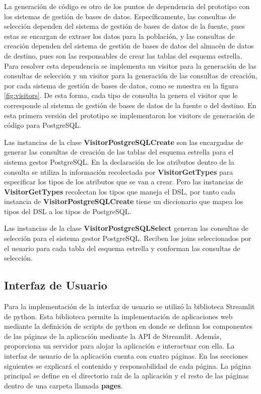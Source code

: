 La generación de código es otro de los puntos de dependencia del prototipo con los sistemas de gestión 
de bases de datos. Específicamente, las consultas de selección dependen del sistema de gestión de bases 
de datos de la fuente, pues estas se encargan de extraer los datos para la población, y las consultas 
de creación dependen del sistema de gestión de bases de datos del almacén de datos de destino, pues 
son las responsables de crear las tablas del esquema estrella. Para resolver esta dependencia 
se implementa un visitor para la generación de las consultas de selección y un visitor para la generación 
de las consultas de creación, por cada sistema de gestión de bases de datos, como se muestra en la 
figura \ref{fig:visitors}. De esta forma, cada tipo de consulta la genera el visitor que le corresponde 
al sistema de gestión de bases de datos de la fuente o del destino. En esta primera versión del prototipo 
se implementaron los visitors de generación de código para PostgreSQL.

Las instancias de la clase \textbf{VisitorPostgreSQLCreate} son las encargadas de generar las 
consultas de creación de las tablas del esquema estrella para el sistema gestor PostgreSQL. En la 
declaración de los atributos 
dentro de la consulta se utiliza la información recolectada por \textbf{VisitorGetTypes} para 
especificar los tipos de los atributos que se van a crear. Pero las instancias de \textbf{VisitorGetTypes} 
recolectan los tipos que maneja el DSL, por tanto cada instancia de \textbf{VisitorPostgreSQLCreate} 
tiene un diccionario que mapea los tipos del DSL a los tipos de PostgreSQL.

Las instancias de la clase \textbf{VisitorPostgreSQLSelect} generan las consultas de selección para 
el sistema gestor PostgreSQL. Reciben los joins seleccionados por el usuario para cada tabla del esquema 
estrella y conforman las consultas de selección.

\subsection{Interfaz de Usuario}

Para la implementación de la interfaz de usuario se utilizó la biblioteca Streamlit de python. Esta biblioteca 
permite la implementación de aplicaciones web mediante la definición de scripts de python en donde se 
definan los componentes de las páginas de la aplicación mediante la API de Streamlit. Además, proporciona un 
servidor para alojar la aplicación e interactuar con ella. La interfaz de usuario de la aplicación cuenta 
con cuatro páginas. En las secciones siguientes se explicar\'a el contenido y responsabilidad de cada página. 
La página principal se define en el directorio raíz de la aplicación y el resto de las páginas dentro 
de una carpeta llamada \textbf{pages}.

